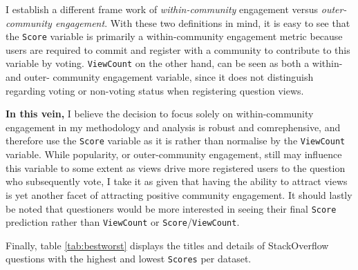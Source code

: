 \documentclass[11pt,preprint, authoryear]{article}
\numberwithin{equation}{section}
\begin{document}
I establish a different frame work of \emph{within-community} engagement
versus \emph{outer-community engagement}. With these two definitions in
mind, it is easy to see that the \texttt{Score} variable is primarily a
within-community engagement metric because users are required to commit
and register with a community to contribute to this variable by voting.
\texttt{ViewCount} on the other hand, can be seen as both a within- and
outer- community engagement variable, since it does not distinguish
regarding voting or non-voting status when registering question views.

\textbf{In this vein,} I believe the decision to focus solely on
within-community engagement in my methodology and analysis is robust and
comrephensive, and therefore use the \texttt{Score} variable as it is
rather than normalise by the \texttt{ViewCount} variable. While
popularity, or outer-community engagement, still may influence this
variable to some extent as views drive more registered users to the
question who subsequently vote, I take it as given that having the
ability to attract views is yet another facet of attracting positive
community engagement. It should lastly be noted that questioners would
be more interested in seeing their final \texttt{Score} prediction
rather than \texttt{ViewCount} or \texttt{Score}/\texttt{ViewCount}.

Finally, table \ref{tab:bestworst} displays the titles and details of
StackOverflow questions with the highest and lowest \texttt{Scores} per
dataset.

\footnotesize
\end{document}

